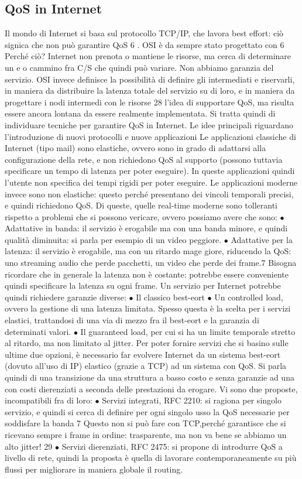 \subsection{QoS in Internet}
Il mondo di Internet si basa sul protocollo TCP/IP, che lavora best effort: ciò
signica che non può garantire QoS 6 . OSI è da sempre stato progettato con
6 Perché ciò? Internet non prenota o mantiene le risorse, ma cerca di determinare un
e o
cammino fra C/S che quindi può variare. Non abbiamo garanzia del servizio. OSI invece
definisce la possibilità di definire gli intermediati e riservarli, in maniera da distribuire la
latenza totale del servizio su di loro, e in maniera da progettare i nodi intermedi con le risorse
28
l'idea di supportare QoS, ma risulta essere ancora lontana da essere realmente
implementata. Si tratta quindi di individuare tecniche per garantire QoS in Internet. Le idee principali riguardano
l'introduzione di nuovi protocolli e nuove
applicazioni
Le applicazioni classiche di Internet (tipo mail) sono elastiche, ovvero sono
in grado di adattarsi alla configurazione della rete, e non richiedono QoS al
supporto (possono tuttavia specificare un tempo di latenza per poter eseguire).
In queste applicazioni quindi l'utente non specifica dei tempi rigidi per poter
eseguire.
Le applicazioni moderne invece sono non elastiche: questo perché presentano
dei vincoli temporali precisi, e quindi richiedono QoS. Di queste, quelle real-time
moderne sono tolleranti rispetto a problemi che si possono vericare, ovvero
possiamo avere che sono:
$\bullet$ Adattative in banda: il servizio è erogabile ma con una banda minore, e
quindi qualità diminuita: si parla per esempio di un video peggiore.
$\bullet$ Adattative per la latenza: il servizio è erogabile, ma con un ritardo mage
giore, riducendo la QoS: uno streaming audio che perde pacchetti, un video
che perde dei frame.7
Bisogna ricordare che in generale la latenza non è costante: potrebbe essere
conveniente quindi specificare la latenza su ogni frame.
Un servizio per Internet potrebbe quindi richiedere garanzie diverse:
$\bullet$ Il classico best-eort
$\bullet$ Un controlled load, ovvero la gestione di una latenza limitata. Spesso
questa è la scelta per i servizi elastici, trattandosi di una via di mezzo fra
il best-eort e la garanzia di determinati valori.
$\bullet$ Il guaranteed load, per cui si ha un limite temporale stretto al ritardo, ma
non limitato al jitter.
Per poter fornire servizi che si basino sulle ultime due opzioni, è necessario
far evolvere Internet da un sistema best-eort (dovuto all'uso di IP) elastico
(grazie a TCP) ad un sistema con QoS. Si parla quindi di una transizione da
una struttura a basso costo e senza garanzie ad una con costi dierenziati a
seconda delle prestazioni da erogare. Vi sono due proposte, incompatibili fra di
loro:
$\bullet$ Servizi integrati, RFC 2210: si ragiona per singolo servizio, e quindi si
cerca di definire per ogni singolo usso la QoS
necessarie per soddisfare la banda
7 Questo non si può fare con TCP,perché garantisce che si ricevano sempre i frame in ordine:
trasparente, ma non va bene se abbiamo un alto jitter!
29
$\bullet$ Servizi dierenziati, RFC 2475: si propone di introdurre QoS a livello di
rete, quindi la proposta è quella di lavorare contemporaneamente su più
flussi per migliorare in maniera globale il routing.
